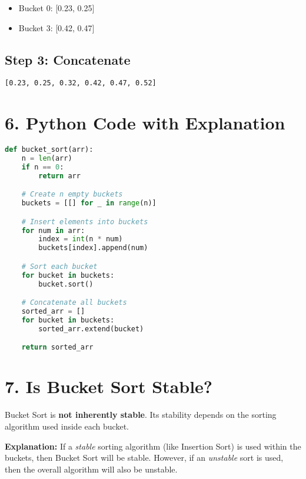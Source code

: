 \documentclass[14pt]{extarticle}
\begin{document}
\begin{itemize}
    \item Bucket 0: [0.23, 0.25]
    \item Bucket 3: [0.42, 0.47]
\end{itemize}

\subsection*{Step 3: Concatenate}

\texttt{[0.23, 0.25, 0.32, 0.42, 0.47, 0.52]}

\section*{6. Python Code with Explanation}

\begin{lstlisting}[language=Python]
def bucket_sort(arr):
    n = len(arr)
    if n == 0:
        return arr

    # Create n empty buckets
    buckets = [[] for _ in range(n)]

    # Insert elements into buckets
    for num in arr:
        index = int(n * num)
        buckets[index].append(num)

    # Sort each bucket
    for bucket in buckets:
        bucket.sort()

    # Concatenate all buckets
    sorted_arr = []
    for bucket in buckets:
        sorted_arr.extend(bucket)

    return sorted_arr
\end{lstlisting}

\section*{7. Is Bucket Sort Stable?}

\begin{tcolorbox}[
  colback=white,
  colframe=black,
  title=Stability of Bucket Sort
]
Bucket Sort is \textbf{not inherently stable}. Its stability depends on the sorting algorithm used inside each bucket.

\medskip

\textbf{Explanation:} If a \textit{stable} sorting algorithm (like Insertion Sort) is used within the buckets, then Bucket Sort will be stable. However, if an \textit{unstable} sort is used, then the overall algorithm will also be unstable.
\end{tcolorbox}
\end{document}
